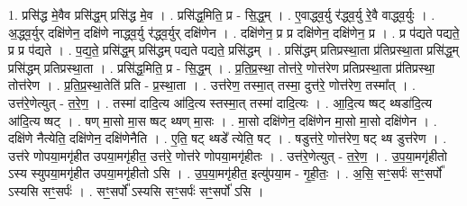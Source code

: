 \documentclass[17pt]{extarticle}
\begin{document}
1. प्रसि॑द्ध मे॒वैव प्रसि॑द्ध॒म् प्रसि॑द्ध मे॒व । . प्रसि॑द्ध॒मिति॒ प्र - सि॒द्ध॒म् । . ए॒वाद्ध्व॒र्यु र॑द्ध्व॒र्यु रे॒वै वाद्ध्व॒र्युः । . अ॒द्ध्व॒र्युर् दक्षि॑णेन॒ दक्षि॑णे नाद्ध्व॒र्यु र॑द्ध्व॒र्युर् दक्षि॑णेन । . दक्षि॑णेन॒ प्र प्र दक्षि॑णेन॒ दक्षि॑णेन॒ प्र । . प्र प॑द्यते पद्यते॒ प्र प्र प॑द्यते । . प॒द्य॒ते॒ प्रसि॑द्ध॒म् प्रसि॑द्धम् पद्यते पद्यते॒ प्रसि॑द्धम् । . प्रसि॑द्धम् प्रतिप्रस्था॒ता प्र॑तिप्रस्था॒ता प्रसि॑द्ध॒म् प्रसि॑द्धम् प्रतिप्रस्था॒ता । . प्रसि॑द्ध॒मिति॒ प्र - सि॒द्ध॒म् । . प्र॒ति॒प्र॒स्था॒ तोत्त॑रे॒ णोत्त॑रेण प्रतिप्रस्था॒ता प्र॑तिप्रस्था॒ तोत्त॑रेण । . प्र॒ति॒प्र॒स्था॒तेति॑ प्रति - प्र॒स्था॒ता । . उत्त॑रेण॒ तस्मा॒त् तस्मा॒ दुत्त॑रे॒ णोत्त॑रेण॒ तस्मा᳚त् । . उत्त॑रे॒णेत्युत् - त॒रे॒ण॒ । . तस्मा॑ दादि॒त्य आ॑दि॒त्य स्तस्मा॒त् तस्मा॑ दादि॒त्यः । . आ॒दि॒त्य ष्षट् थ्षडा॑दि॒त्य आ॑दि॒त्य ष्षट् । . षण् मा॒सो मा॒स ष्षट् थ्षण् मा॒सः । . मा॒सो दक्षि॑णेन॒ दक्षि॑णेन मा॒सो मा॒सो दक्षि॑णेन । . दक्षि॑णे नैत्येति॒ दक्षि॑णेन॒ दक्षि॑णेनैति । . ए॒ति॒ षट् थ्षडे᳚ त्येति॒ षट् । . षडुत्त॑रे॒ णोत्त॑रेण॒ षट् थ्ष डुत्त॑रेण । . उत्त॑रे णोपया॒मगृ॑हीत उपया॒मगृ॑हीत॒ उत्त॑रे॒ णोत्त॑रे णोपया॒मगृ॑हीतः । . उत्त॑रे॒णेत्युत् - त॒रे॒ण॒ । . उ॒प॒या॒मगृ॑हीतो ऽस्य स्युपया॒मगृ॑हीत उपया॒मगृ॑हीतो ऽसि । . उ॒प॒या॒मगृ॑हीत॒ इत्यु॑पया॒म - गृ॒ही॒तः॒ । . अ॒सि॒ सꣳ॒॒सर्पः॑ सꣳ॒॒सर्पो᳚ ऽस्यसि सꣳ॒॒सर्पः॑ । . सꣳ॒॒सर्पो᳚ ऽस्यसि सꣳ॒॒सर्पः॑ सꣳ॒॒सर्पो॑ ऽसि । \newline
\end{document}
